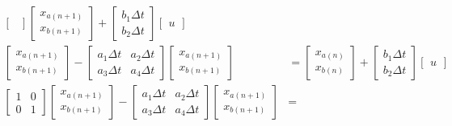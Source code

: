 \documentclass[11pt]{article}
\begin{document}
\begin{subequations}
\begin{align}
\begin{bmatrix}
    \end{bmatrix}
    \begin{bmatrix}
      x_{a(n+1)} \\
      x_{b(n+1)}
    \end{bmatrix} +
    \begin{bmatrix}
      b_1\Delta t \\
      b_2\Delta t
    \end{bmatrix}
    \begin{bmatrix}
      u
    \end{bmatrix} \\
    \begin{bmatrix}
      x_{a(n+1)} \\
      x_{b(n+1)}
    \end{bmatrix} -
    \begin{bmatrix}
      a_1\Delta t & a_2\Delta t \\
      a_3\Delta t & a_4\Delta t
    \end{bmatrix}
    \begin{bmatrix}
      x_{a(n+1)} \\
      x_{b(n+1)}
    \end{bmatrix} &=
    \begin{bmatrix}
      x_{a(n)} \\
      x_{b(n)}
    \end{bmatrix} +
    \begin{bmatrix}
      b_1\Delta t \\
      b_2\Delta t
    \end{bmatrix}
    \begin{bmatrix}
      u
    \end{bmatrix} \\
    \begin{bmatrix}
      1 & 0 \\
      0 & 1
    \end{bmatrix}
    \begin{bmatrix}
      x_{a(n+1)} \\
      x_{b(n+1)}
    \end{bmatrix} -
    \begin{bmatrix}
      a_1\Delta t & a_2\Delta t \\
      a_3\Delta t & a_4\Delta t
    \end{bmatrix}
    \begin{bmatrix}
      x_{a(n+1)} \\
      x_{b(n+1)}
    \end{bmatrix} &=

\end{align}
\end{subequations}
\end{document}
